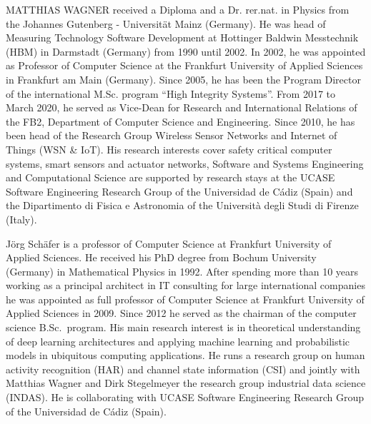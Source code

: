 \documentclass{ieeeaccess}
\begin{document}
\begin{IEEEbiography}
{MATTHIAS WAGNER} received a Diploma and a Dr. rer.nat. in Physics from the Johannes Gutenberg - Universität Mainz (Germany). He was head of Measuring Technology Software Development at Hottinger Baldwin Messtechnik (HBM) in Darmstadt (Germany) from 1990 until 2002. In 2002, he was appointed as Professor of Computer Science at the Frankfurt University of Applied Sciences in Frankfurt am Main (Germany). Since 2005, he has been the Program Director of the international M.Sc. program “High Integrity Systems”. From 2017 to March 2020, he served as Vice-Dean for Research and International Relations of the FB2, Department of Computer Science and Engineering. Since 2010, he has been head of the Research Group Wireless Sensor Networks and Internet of Things (WSN \& IoT). His research interests cover safety critical computer systems, smart sensors and actuator networks, Software and Systems Engineering and Computational Science are supported by research stays at the UCASE Software Engineering Research Group of the Universidad de Cádiz (Spain) and the Dipartimento di Fisica e Astronomia of the Università degli Studi di Firenze (Italy). 
\end{IEEEbiography}

\begin{IEEEbiography}{Jörg Schäfer} is a professor of Computer Science at Frankfurt University of Applied Sciences. He received his PhD degree from Bochum University (Germany) in Mathematical Physics in 1992. After spending more than 10 years working as a principal architect in IT consulting for large international companies he was  appointed as full professor of Computer Science at Frankfurt University of Applied Sciences in 2009. Since 2012 he served as the chairman of the computer science B.Sc.\ program. 
His  main research interest is in theoretical understanding of deep learning architectures and applying machine learning and probabilistic models in ubiquitous computing applications. He runs a research group on human activity recognition (HAR) and channel state information (CSI) and jointly with Matthias Wagner and Dirk Stegelmeyer the research group industrial data science (INDAS). He is collaborating with UCASE Software Engineering Research Group of the Universidad de Cádiz (Spain). 
\end{IEEEbiography}
\end{document}
